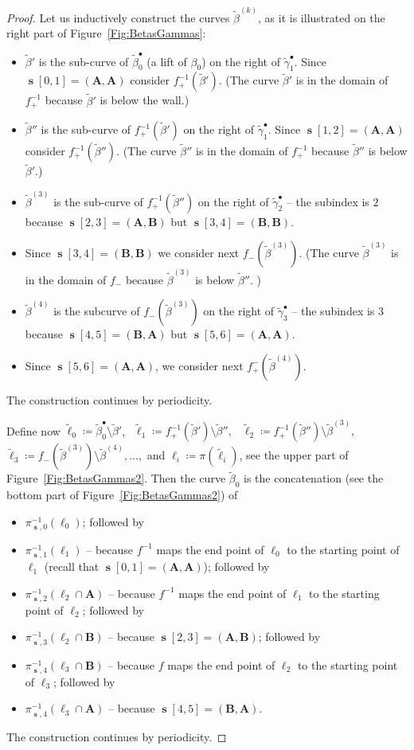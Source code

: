 \documentclass[]{amsart}
\renewcommand{\sp}{{\ \ }}
\newcommand\seq{{\operatorname{\mathbf s}}}
\newcommand\oseq{{\bullet}}
\newcommand{\A}{\mathbf A}
\newcommand{\B}{\mathbf B}
\newcommand\wbeta{{\widetilde \beta}}
\newcommand\wgamma{{\widetilde \gamma}}
\theoremstyle{remark}
\numberwithin{equation}{section}
\theoremstyle{definition}
\begin{document}
\begin{proof}
Let us inductively construct the curves $\wbeta^{(k)}$, as it is illustrated on the right part of Figure~\ref{Fig:BetasGammas}:
\begin{itemize}
\item $\wbeta'$ is the sub-curve of $\wbeta^\oseq_0$ (a lift of $\beta_0$) on the right of $\wgamma^\oseq_1$. Since $\seq[0,1]=(\A,\A)$ consider $f_+^{-1}(\wbeta')$. (The curve $\wbeta'$ is in the domain of $f_+^{-1}$ because $\wbeta'$ is below the wall.)
\item $\wbeta''$ is the sub-curve of $f_+^{-1}(\wbeta')$ on the right of $\wgamma^\oseq_1$. Since $\seq[1,2]=(\A,\A)$ consider $f_+^{-1}(\wbeta'')$. (The curve $\wbeta''$ is in the domain of $f_+^{-1}$ because $\wbeta''$ is below $\wbeta'$.)
\item $\wbeta^{(3)}$ is the  sub-curve of $f_+^{-1}(\wbeta'')$ on the right of $\wgamma^\oseq_2$ -- the subindex is $2$ because $\seq[2,3]=(\A,\B)$ but $\seq[3,4]=(\B,\B)$.
\item Since $\seq[3,4]=(\B,\B)$ we consider next $f_-(\wbeta^{(3)})$.  (The curve $\wbeta^{(3)}$ is in the domain of $f_-$ because  $\wbeta^{(3)}$ is below $\wbeta''$. )
\item $\wbeta^{(4)}$ is the subcurve of $f_-(\wbeta^{(3)})$ on the right of $\wgamma^\oseq_3$ -- the subindex is $3$ because $\seq[4,5]=(\B,\A)$ but $\seq[5,6]=(\A,\A)$. 
\item Since $\seq[5,6]=(\A,\A)$, we consider next $f_+^{-}(\wbeta^{(4)})$.
\end{itemize} 
The construction continues by periodicity.


Define now ${\widetilde \ell_0\coloneqq \wbeta^\oseq_0\setminus \wbeta'}$, $\sp {\widetilde \ell_1\coloneqq f_+^{-1}(\wbeta')\setminus \wbeta''},$ $\sp{\widetilde \ell_2\coloneqq f_+^{-1}(\wbeta'')\setminus \wbeta^{(3)}},$\newline ${\widetilde \ell_3\coloneqq f_-(\wbeta^{(3)})\setminus \wbeta^{(4)},\dots},$  and $\ell_i\coloneqq \pi(\widetilde \ell_i)$, see the upper part of Figure~\ref{Fig:BetasGammas2}. Then the curve $\wbeta_0$ is the concatenation (see the bottom part of Figure~\ref{Fig:BetasGammas2}) of
\begin{itemize}
\item $\pi_{\seq ,0}^{-1}(\ell_0)$; followed by
\item $ \pi_{\seq,1}^{-1}(\ell_1)$ -- because $f^{-1}$ maps the end point of $\ell_0$ to the starting point of $\ell_1$ (recall that $\seq[0,1]=(\A,\A)$); followed by 
\item $\pi_{\seq,2}^{-1}(\ell_2\cap \A)$ -- because $f^{-1}$ maps the end point of $\ell_1$ to the starting point of $\ell_2$; followed by
\item $\pi_{\seq,3}^{-1}(\ell_2\cap \B)$ -- because $\seq[2,3]=(\A,\B)$; followed by  
\item $\pi_{\seq,4}^{-1}(\ell_3\cap \B)$ -- because $f$ maps the end point of $\ell_2$ to the starting point of $\ell_3$; followed by
\item  $\pi_{\seq,4}^{-1}(\ell_3\cap \A)$ -- because $\seq[4,5]=(\B,\A)$.
\end{itemize} 
The construction continues by periodicity.


\end{proof}
\end{document}
